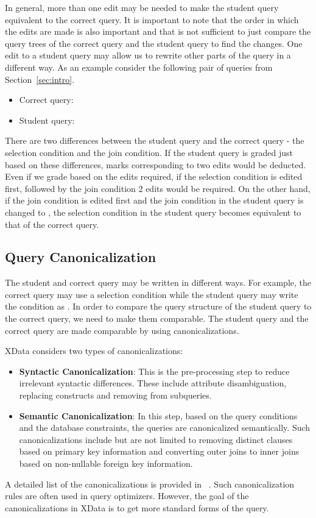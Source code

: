 In general, more than one edit may be needed to make the student query equivalent to the correct query. It is important to note that the order in which the edits are made is also important and that is not sufficient to just compare the query trees of the correct query and the student query to find the changes. One edit to a student query may allow us to rewrite other parts of the query in a different way. As an example consider the following pair of queries from Section~\ref{sec:intro}.
\begin{itemize}
    \item Correct query: 
    \item Student query: 
\end{itemize}

There are two differences between the student query and the correct query - the selection condition and the join condition. If the student query is graded just based on these differences, marks corresponding to two edits would be deducted. Even if we grade based on the edits required, if the selection condition is edited first, followed by the join condition 2 edits would be required. On the other hand, if the join condition is edited first and the join condition in the student query is changed to , the selection condition in the student query becomes equivalent to that of the correct query. 

\subsection{Query Canonicalization}
The student and correct query may be written in different ways. For example, the correct query may use a selection condition  while the student query may write the condition as . In order to compare the query structure of the student query to the correct query, we need to make them comparable. The student query and the correct query are made comparable by using canonicalizations. 

XData considers two types of canonicalizations:
\begin{itemize}
    \item \textbf{Syntactic Canonicalization}: This is the pre-processing step to reduce irrelevant syntactic differences. These include attribute disambiguation, replacing  constructs and removing  from subqueries. 
    \item \textbf{Semantic Canonicalization}: In this step, based on the query conditions and the database constraints, the queries are canonicalized semantically. Such canonicalizations include but are not limited to removing distinct clauses based on primary key information and converting outer joins to inner joins based on non-nullable foreign key information. 
\end{itemize}
A detailed list of the canonicalizations is provided in ~\cite{xdata:comad}. Such canonicalization rules are often used in query optimizers. However, the goal of the canonicalizations in XData is to get more standard forms of the query.

